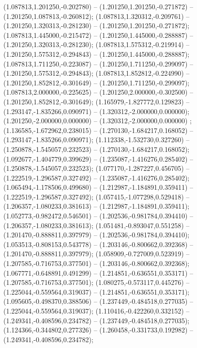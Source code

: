  (1.087813,1.201250,-0.202780) -- (1.201250,1.201250,-0.271872) -- (1.201250,1.087813,-0.260812);
 (1.087813,1.320312,-0.209761) -- (1.201250,1.320313,-0.281230) -- (1.201250,1.201250,-0.271872);
 (1.087813,1.445000,-0.215472) -- (1.201250,1.445000,-0.288887) -- (1.201250,1.320313,-0.281230);
 (1.087813,1.575312,-0.219914) -- (1.201250,1.575312,-0.294843) -- (1.201250,1.445000,-0.288887);
 (1.087813,1.711250,-0.223087) -- (1.201250,1.711250,-0.299097) -- (1.201250,1.575312,-0.294843);
 (1.087813,1.852812,-0.224990) -- (1.201250,1.852812,-0.301649) -- (1.201250,1.711250,-0.299097);
 (1.087813,2.000000,-0.225625) -- (1.201250,2.000000,-0.302500) -- (1.201250,1.852812,-0.301649);
 (1.165979,-1.827772,0.129823) -- (1.293147,-1.835266,0.090971) -- (1.320312,-2.000000,0.000000);
 (1.201250,-2.000000,0.000000) -- (1.320312,-2.000000,0.000000) ;
 (1.136585,-1.672962,0.238015) -- (1.270130,-1.684217,0.168052) -- (1.293147,-1.835266,0.090971);
 (1.112338,-1.532730,0.327260) -- (1.250878,-1.545057,0.232523) -- (1.270130,-1.684217,0.168052);
 (1.092677,-1.404779,0.399629) -- (1.235087,-1.416276,0.285402) -- (1.250878,-1.545057,0.232523);
 (1.077170,-1.287227,0.456705) -- (1.222519,-1.296587,0.327492) -- (1.235087,-1.416276,0.285402);
 (1.065494,-1.178506,0.499680) -- (1.212987,-1.184891,0.359411) -- (1.222519,-1.296587,0.327492);
 (1.057415,-1.077298,0.529418) -- (1.206357,-1.080233,0.381613) -- (1.212987,-1.184891,0.359411);
 (1.052773,-0.982472,0.546501) -- (1.202536,-0.981784,0.394410) -- (1.206357,-1.080233,0.381613);
 (1.051481,-0.893047,0.551258) -- (1.201470,-0.888811,0.397979) -- (1.202536,-0.981784,0.394410);
 (1.053513,-0.808153,0.543778) -- (1.203146,-0.800662,0.392368) -- (1.201470,-0.888811,0.397979);
 (1.058909,-0.727009,0.523919) -- (1.207585,-0.716753,0.377501) -- (1.203146,-0.800662,0.392368);
 (1.067771,-0.648891,0.491299) -- (1.214851,-0.636551,0.353171) -- (1.207585,-0.716753,0.377501);
 (1.080275,-0.573117,0.445276) -- (1.225044,-0.559564,0.319037) -- (1.214851,-0.636551,0.353171);
 (1.095605,-0.498370,0.388506) -- (1.237449,-0.484518,0.277035) -- (1.225044,-0.559564,0.319037);
 (1.110416,-0.422260,0.332152) -- (1.249341,-0.408596,0.234782) -- (1.237449,-0.484518,0.277035);
 (1.124366,-0.344802,0.277326) -- (1.260458,-0.331733,0.192982) -- (1.249341,-0.408596,0.234782);

